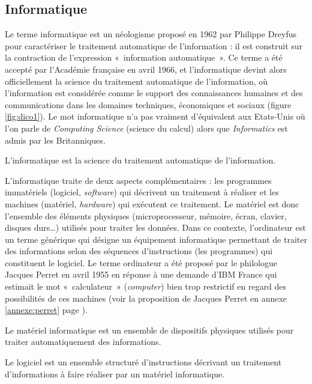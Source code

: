 \subsection{Informatique}
Le terme {\sc informatique} est un néologisme proposé en 1962 par
Philippe Dreyfus pour caractériser le traitement automatique de l'information :
il est construit sur la contraction de l'expression  «~information automatique~».
Ce terme a été accepté par l'Académie française en avril 1966, et l'informatique devint alors
officiellement la science du traitement automatique de l'information, où l'information
est considérée comme le support des connaissances humaines et des communications 
dans les domaines techniques, économiques et sociaux (figure \ref{fig:dico1}).
Le mot {\sc informatique} n'a pas vraiment d'équivalent aux Etats-Unis où l'on parle de 
{\em Computing Science} (science du calcul) alors que {\em Informatics} est admis par les Britanniques. 

\begin{defin}\label{def:informatique}
L'informatique est la science du traitement automatique de l'information.
\end{defin}

L'informatique traite de deux aspects complémentaires : les programmes immatériels (logiciel, {\em software})
qui décrivent un traitement à réaliser et les machines (matériel, {\em hardware}) qui exécutent ce traitement.
Le matériel est donc l'ensemble des éléments physiques (microprocesseur, mémoire, écran, clavier, disques durs\ldots)
utilisés pour traiter les données. 
Dans ce contexte, l'ordinateur est un terme générique qui désigne un équipement informatique permettant de traiter des 
informations selon des séquences d'instructions (les programmes) qui constituent le logiciel.
Le terme {\sc ordinateur} a été proposé par le philologue Jacques Perret en avril 1955 
en réponse à une demande d'IBM France qui estimait le mot «~calculateur~» ({\em computer}) 
bien trop restrictif en regard des possibilités de ces machines (voir la proposition de 
Jacques Perret en annexe \ref{annexe:perret} page \pageref{annexe:perret}).

\begin{defin}\label{def:materiel}
Le matériel informatique est un ensemble de dispositifs physiques utilisés pour traiter
automatiquement des informations.
\end{defin}
\begin{defin}\label{def:logiciel}
Le logiciel est un ensemble structuré d'instructions décrivant un traitement d'informations
à faire réaliser par un matériel informatique.
\end{defin}


